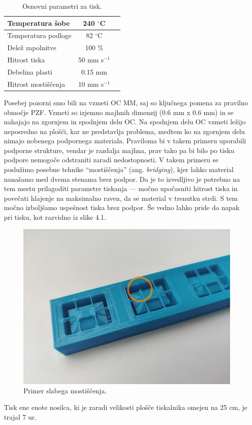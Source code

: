 \documentclass[12pt]{report}
\begin{document}
\begin{table}[H]
  \caption{Osnovni parametri za tisk.}
  \centering
  \begin{tabular}{ | l | c | r | }
    \hline
    Temperatura šobe & 240 $^{\circ}$C \\ \hline
    Temperatura podloge & 82 $^{\circ}$C \\ \hline
    Delež zapolnitve & 100 \% \\ \hline
    Hitrost tiska & 50 mm s$^{-1}$ \\ \hline
    Debelina plasti & 0.15 mm \\ \hline
    Hitrost mostiščenja & 10 mm s$^{-1}$ \\
    \hline  
  \end{tabular}
\end{table}

\noindent Posebej pozorni smo bili na vzmeti \ac{OC} \ac{MM}, saj so ključnega pomena za pravilno območje \ac{PZF}. Vzmeti so izjemno majhnih dimenzij (0.6 mm x 0.6 mm) in se nahajajo na zgornjem
in spodnjem delu \ac{OC}. Na spodnjem delu \ac{OC} vzmeti ležijo neposredno na plošči, kar ne predstavlja problema, medtem ko na zgornjem delu nimajo nobenega podpornega materiala. Praviloma bi v takem
primeru uporabili podporne strukture, vendar je razdalja majhna, prav tako pa bi bilo po tisku podpore nemogoče odstraniti zaradi nedostopnosti. V takem primeru se poslužimo posebne tehnike ``mostiščenja'' (ang. \emph{bridging}), kjer lahko
material nanašamo med dvema stenama brez podpor. Da je to izvedljivo je potrebno na tem mestu prilagoditi parametre tiskanja --- močno upočasniti hitrost tiska in povečati hlajenje na maksimalno raven, da se material v trenutku strdi. S tem močno izboljšamo
uspešnost tiska brez podpor. Še vedno lahko pride do napak pri tisku, kot razvidno iz slike 4.1.

\begin{figure}[H]
  \centering
  \includegraphics[scale=0.4]{Images/mostiscenje_small.jpg}
  \caption{Primer slabega mostiščenja.}
\end{figure}
\noindent Tisk ene enote nosilca, ki je zaradi velikosti plošče tiskalnika omejen na 25 cm, je trajal 7 ur.
\end{document}
